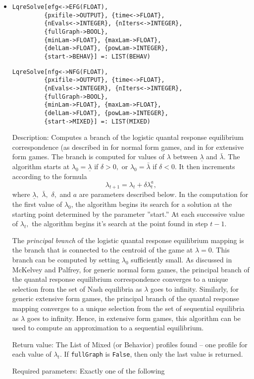 \begin{itemize}
\item
\protect \large \begin{verbatim}
LqreSolve[efg<->EFG(FLOAT),
         {pxifile->OUTPUT}, {time<->FLOAT},
         {nEvals<->INTEGER}, {nIters<->INTEGER},
         {fullGraph->BOOL},
         {minLam->FLOAT}, {maxLam->FLOAT}, 
         {delLam->FLOAT}, {powLam->INTEGER}, 
         {start->BEHAV}] =: LIST(BEHAV)
\end{verbatim}\normalsize

\protect \large \begin{verbatim}
LqreSolve[nfg<->NFG(FLOAT),
         {pxifile->OUTPUT}, {time<->FLOAT},
         {nEvals<->INTEGER}, {nIters<->INTEGER},
         {fullGraph->BOOL},
         {minLam->FLOAT}, {maxLam->FLOAT}, 
         {delLam->FLOAT}, {powLam->INTEGER}, 
         {start->MIXED}] =: LIST(MIXED)
\end{verbatim}\normalsize

\bd
\item
[Description:] Computes a branch of the logistic quantal response
equilibrium correspondence (as described in \cite[1995]{McKPal:95a}
for normal form games, and in \cite[1995b]{McKPal:95b} for extensive
form games.  The branch is computed for values of $\lambda$ between
$\underline{\lambda}$ and $\bar{\lambda}.$ The algorithm starts at
$\lambda_0 = \underline{\lambda}$ if $\delta>0,$ or $\lambda_0 =
\bar{\lambda}$ if $\delta<0$. It then increments according to the
formula 
$$
\lambda_{t+1} = \lambda_t +\delta \lambda_t^a,
$$ where $\underline\lambda,$ $\bar\lambda,$ $\delta,$ and $a$ are
parameters described below. In the computation for the first value of
$\lambda_0$, the algorithm begins its search for a solution at the
starting point determined by the parameter ''start.''  At each
successive value of $\lambda_t,$ the algorithm begins it's search at
the point found in step $t - 1.$ 

The {\em principal branch} of the logistic quantal response
equilibrium mapping is the branch that is connected to the centroid of
the game at $\lambda = 0$.  This branch can be computed by setting
$\lambda_0$ sufficiently small.  As discussed in McKelvey and Palfrey,
for generic normal form games, the principal branch of the quantal
response equilibrium correspondence converges to a unique selection
from the set of Nash equilibria as $\lambda$ goes to infinity.
Similarly, for generic extensive form games, the principal branch of
the quantal response mapping converges to a unique selection from the
set of sequential equilibria as $\lambda$ goes to infinity.  Hence, in
extensive form games, this algorithm can be used to compute an
approximation to a sequential equilibrium.
\item
[Return value:] The List of Mixed (or Behavior) profiles found -- one
profile for each value of $\lambda_t$.  If \verb+fullGraph+ is
\verb+False+, then only the last value is returned.  
\item 
[Required parameters:]\hfil\null Exactly one of the following


\end{itemize}
